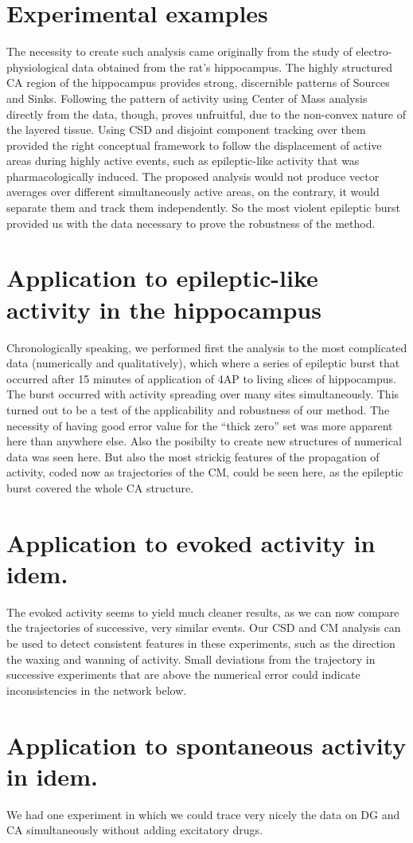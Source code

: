 \documentclass{article}
\begin{document}
\section{Experimental examples}

The necessity to create such analysis came originally from the study of electro-physiological data obtained from the rat's hippocampus. The highly structured CA region of the hippocampus provides strong, discernible patterns of Sources and Sinks. Following the pattern of activity using Center of Mass analysis directly from the data, though, proves unfruitful, due to the non-convex nature of the layered tissue. Using CSD and disjoint component tracking over them provided the right conceptual framework to follow the displacement of active areas during highly active events, such as epileptic-like activity that was pharmacologically induced. The proposed analysis would not produce vector averages over different simultaneously active areas, on the contrary, it would separate them and track them independently. So the most violent epileptic burst provided us with the data necessary to prove the robustness of the method. 


\section{Application to epileptic-like activity in the hippocampus}
Chronologically speaking, we performed first the analysis to the most complicated data (numerically and qualitatively), which where a series of epileptic burst that occurred after 15 minutes of application of 4AP to living slices of hippocampus. The burst occurred with activity spreading over many sites simultaneously. This turned out to be a test of the applicability and robustness of our method. The necessity of having good error value for the ``thick zero'' set was more apparent here than anywhere else. Also the posibilty to create new structures of numerical data was seen here.  But also the most strickig features of the propagation of activity, coded now as trajectories of the CM, could be seen here, as the epileptic burst covered the whole CA structure. 

\section{Application to evoked activity in idem.}

The evoked activity seems to yield much cleaner results, as we can now compare the trajectories of successive, very similar events. Our CSD and CM analysis can be used to detect consistent features in these experiments, such as the direction the waxing and wanning of activity. Small deviations from the trajectory in successive experiments that are above the numerical error could indicate inconsistencies in the network below. 

\section{Application to spontaneous activity in idem.}

We had one experiment in which we could trace very nicely the data on DG and CA simultaneously without adding excitatory drugs. 


 
\end{document}
